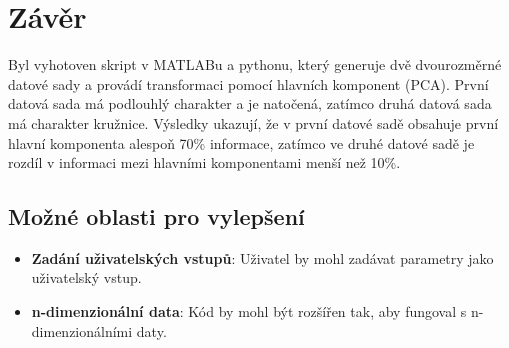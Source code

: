 \section{Závěr}

Byl vyhotoven skript v MATLABu a pythonu, který generuje dvě dvourozměrné datové sady a provádí transformaci pomocí hlavních komponent (PCA). První datová sada má podlouhlý charakter a je natočená, zatímco druhá datová sada má charakter kružnice. Výsledky ukazují, že v první datové sadě obsahuje první hlavní komponenta alespoň 70\% informace, zatímco ve druhé datové sadě je rozdíl v informaci mezi hlavními komponentami menší než 10\%.

\subsection{Možné oblasti pro vylepšení}

\begin{itemize}
    \item \textbf{Zadání uživatelských vstupů}: Uživatel by mohl zadávat parametry jako uživatelský vstup.
    \item \textbf{n-dimenzionální data}: Kód by mohl být rozšířen tak, aby fungoval s n-dimenzionálními daty.
\end{itemize}